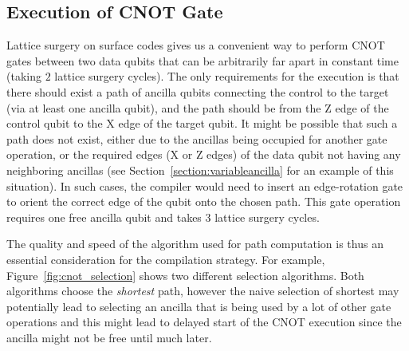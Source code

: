 

\subsection{Execution of CNOT Gate}
Lattice surgery on surface codes gives us a convenient way to perform CNOT gates between two data qubits that can be arbitrarily far apart in constant time (taking $2$ lattice surgery cycles). The only requirements for the execution is that there should exist a path of ancilla qubits connecting the control to the target (via at least one ancilla qubit), and the path should be from the Z edge of the control qubit to the X edge of the target qubit. It might be possible that such a path does not exist, either due to the ancillas being occupied for another gate operation, or the required edges (X or Z edges) of the data qubit not having any neighboring ancillas (see Section~\ref{section:variableancilla} for an example of this situation). In such cases, the compiler would need to insert an edge-rotation gate to orient the correct edge of the qubit onto the chosen path. This gate operation requires one free ancilla qubit and takes $3$ lattice surgery cycles.\par
The quality and speed of the algorithm used for path computation is thus an essential consideration for the compilation strategy. %
For example, Figure~\ref{fig:cnot_selection} shows two different selection algorithms. Both algorithms choose the \textit{shortest} path, however the naive selection of shortest may potentially lead to selecting an ancilla that is being used by a lot of other gate operations and this might lead to delayed start of the CNOT execution since the ancilla might not be free until much later.
